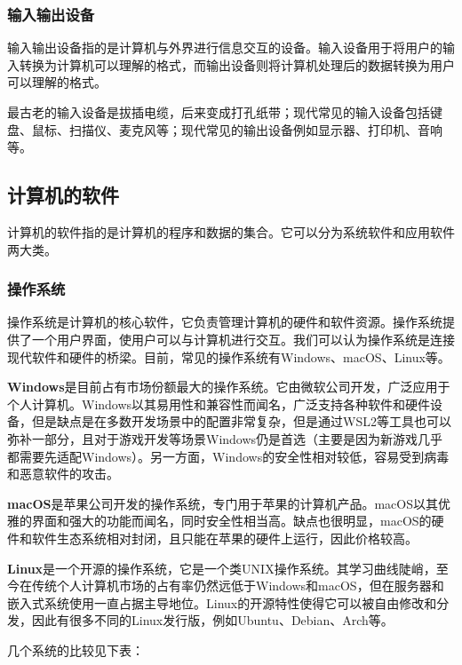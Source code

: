 \subsubsection{输入输出设备}

输入输出设备指的是计算机与外界进行信息交互的设备。输入设备用于将用户的输入转换为计算机可以理解的格式，而输出设备则将计算机处理后的数据转换为用户可以理解的格式。

最古老的输入设备是拔插电缆，后来变成打孔纸带；现代常见的输入设备包括键盘、鼠标、扫描仪、麦克风等；现代常见的输出设备例如显示器、打印机、音响等。

\subsection{计算机的软件}

计算机的软件指的是计算机的程序和数据的集合。它可以分为系统软件和应用软件两大类。

\subsubsection{操作系统}

操作系统是计算机的核心软件，它负责管理计算机的硬件和软件资源。操作系统提供了一个用户界面，使用户可以与计算机进行交互。我们可以认为操作系统是连接现代软件和硬件的桥梁。目前，常见的操作系统有Windows、macOS、Linux等。

\textbf{Windows}\faWindows 是目前占有市场份额最大的操作系统。它由微软公司开发，广泛应用于个人计算机。Windows以其易用性和兼容性而闻名，广泛支持各种软件和硬件设备，但是缺点是在多数开发场景中的配置非常复杂，但是通过WSL2等工具也可以弥补一部分，且对于游戏开发等场景Windows仍是首选（主要是因为新游戏几乎都需要先适配Windows）。另一方面，Windows的安全性相对较低，容易受到病毒和恶意软件的攻击。

\textbf{macOS}\faApple 是苹果公司开发的操作系统，专门用于苹果的计算机产品。macOS以其优雅的界面和强大的功能而闻名，同时安全性相当高。缺点也很明显，macOS的硬件和软件生态系统相对封闭，且只能在苹果的硬件上运行，因此价格较高。

\textbf{Linux}\faLinux 是一个开源的操作系统，它是一个类UNIX操作系统。其学习曲线陡峭，至今在传统个人计算机市场的占有率仍然远低于Windows和macOS，但在服务器和嵌入式系统使用一直占据主导地位。Linux的开源特性使得它可以被自由修改和分发，因此有很多不同的Linux发行版，例如Ubuntu、Debian、Arch等。

几个系统的比较见下表：

